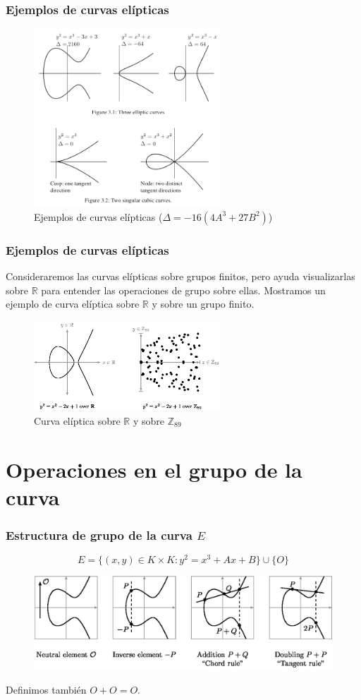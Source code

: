 \documentclass[xcolor=x11names,compress,utf8, 9pt]{beamer}
\begin{document}
\begin{frame}\frametitle{Ejemplos de curvas elípticas}
\begin{figure}[H]
  \centering
  \includegraphics[width=70mm]{imagenes/curvas}
  \caption{Ejemplos de curvas elípticas ($\Delta = -16(4A^3 + 27B^2)$)}
\end{figure}
\end{frame}

\begin{frame}\frametitle{Ejemplos de curvas elípticas}
  Consideraremos las curvas elípticas sobre grupos finitos, pero ayuda
visualizarlas sobre $\mathbb{R}$ para entender las operaciones de
grupo sobre ellas. Mostramos un ejemplo de curva elíptica sobre
$\mathbb{R}$ y sobre un grupo finito.
\begin{figure}[H]
  \centering
  \includegraphics[width=70mm]{imagenes/curvas_Fp}
\caption{Curva elíptica sobre $\mathbb{R}$ y sobre $\mathbb{Z}_{89}$}
\end{figure}
\end{frame}

\section{Operaciones en el grupo de la curva}

\begin{frame}\frametitle{Estructura de grupo de la curva $E$}
  \[E=\{(x,y)\in K\times K:y^2=x^3+Ax+B\}\cup\{O\}\]
\begin{figure}[H]
  \centering
  \includegraphics[width=112mm]{imagenes/operaciones}
\end{figure}

Definimos también $O+O=O$.
\end{frame}
\end{document}

